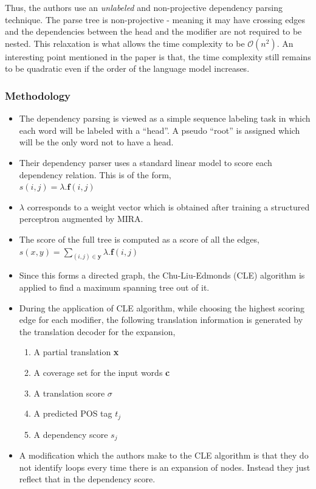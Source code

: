 \documentclass[10pt, letter]{article}
\newcommand{\bigO}{\ensuremath{\mathcal{O}}}
\begin{document}
Thus, the authors use an \textit{unlabeled} and non-projective dependency parsing technique. The parse tree is non-projective - meaning it may have crossing edges and the dependencies between the head and the modifier are not required to be nested. This relaxation is what allows the time complexity to be $\bigO(n^2)$. An interesting point mentioned in the paper is that, the time complexity still remains to be quadratic even if the order of the language model increases.
\subsubsection*{Methodology}
\begin{itemize}
	\item The dependency parsing is viewed as a simple sequence labeling task in which each word will be labeled with a ``head''. A pseudo ``root'' is assigned which will be the only word not to have a head.
	\item Their dependency parser uses a standard linear model to score each dependency relation. This is of the form,\\
	$s(i,j) = \lambda.\textbf{f}(i,j)$
	\item $\lambda$ corresponds to a weight vector which is obtained after training a structured perceptron augmented by MIRA.
	\item The score of the full tree is computed as a score of all the edges, \\
	$s(x,y) = \sum_{(i,j)\in \textbf{y}} \lambda. \textbf{f}(i,j)$
	\item Since this forms a directed graph, the Chu-Liu-Edmonds (CLE) algorithm is applied to find a maximum spanning tree out of it.
	\item During the application of CLE algorithm, while choosing the highest scoring edge for each modifier, the following translation information is generated by the translation decoder for the expansion,
		\begin{enumerate}
			\item A partial translation \textbf{x}
			\item A coverage set for the input words \textbf{c}
			\item A translation score $\sigma$
			\item A predicted POS tag $t_j$
			\item A dependency score $s_j$
		\end{enumerate}
	\item A modification which the authors make to the CLE algorithm is that they do not identify loops every time there is an expansion of nodes. Instead they just reflect that in the dependency score.
\end{itemize}
\end{document}
